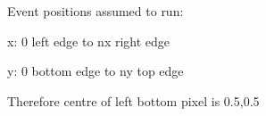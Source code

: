 \documentclass[letterpaper,10pt,english]{sphinxmanual}
\begin{document}
\begin{fulllineitems}
\begin{DUlineblock}{0em}
\item[] Event positions assumed to run:
\item[]
\begin{DUlineblock}{\DUlineblockindent}
\item[] x: 0 left edge to nx right edge
\item[] y: 0 bottom edge to ny top edge
\end{DUlineblock}
\item[] Therefore centre of left bottom pixel is 0.5,0.5
\end{DUlineblock}

\end{fulllineitems}

\end{document}

